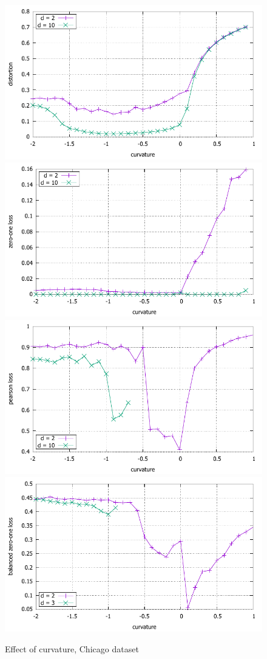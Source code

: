 \documentclass{article} %
\begin{document}
\begin{figure}
    \centering
    \includegraphics[width = 0.49 \textwidth]{chicago_distortion.pdf}
    \includegraphics[width = 0.49 \textwidth]{chicago_zero_one.pdf}
    \includegraphics[width = 0.49 \textwidth]{chicago_pearson.pdf}
    \includegraphics[width = 0.49 \textwidth]{chicago_balanced_zero_one.pdf}
    \caption{Effect of curvature, Chicago dataset}
    \label{fig:chicago}
\end{figure}
\end{document}
